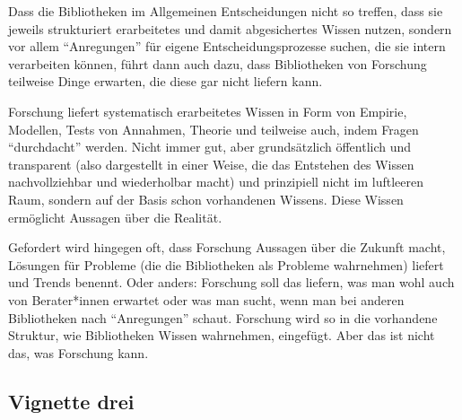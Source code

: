 \documentclass[a4paper,
fontsize=11pt,
oneside,
numbers=noperiodatend,
parskip=half-,
bibliography=totoc,
final
]{scrartcl}
\begin{document}
Dass die Bibliotheken im Allgemeinen Entscheidungen nicht so treffen,
dass sie jeweils strukturiert erarbeitetes und damit abgesichertes
Wissen nutzen, sondern vor allem \enquote{Anregungen} für eigene
Entscheidungsprozesse suchen, die sie intern verarbeiten können, führt
dann auch dazu, dass Bibliotheken von Forschung teilweise Dinge
erwarten, die diese gar nicht liefern kann.

Forschung liefert systematisch erarbeitetes Wissen in Form von Empirie,
Modellen, Tests von Annahmen, Theorie und teilweise auch, indem Fragen
\enquote{durchdacht} werden. Nicht immer gut, aber grundsätzlich
öffentlich und transparent (also dargestellt in einer Weise, die das
Entstehen des Wissen nachvollziehbar und wiederholbar macht) und
prinzipiell nicht im luftleeren Raum, sondern auf der Basis schon
vorhandenen Wissens. Diese Wissen ermöglicht Aussagen über die Realität.

Gefordert wird hingegen oft, dass Forschung Aussagen über die Zukunft
macht, Lösungen für Probleme (die die Bibliotheken als Probleme
wahrnehmen) liefert und Trends benennt. Oder anders: Forschung soll das
liefern, was man wohl auch von Berater*innen erwartet oder was man
sucht, wenn man bei anderen Bibliotheken nach \enquote{Anregungen}
schaut. Forschung wird so in die vorhandene Struktur, wie Bibliotheken
Wissen wahrnehmen, eingefügt. Aber das ist nicht das, was Forschung
kann.

\hypertarget{vignette-drei}{%
\subsection{Vignette drei}\label{vignette-drei}}
\end{document}
